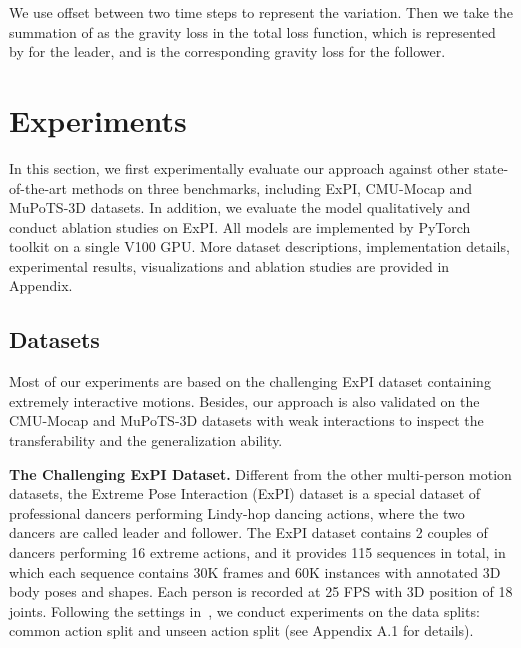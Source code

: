 \documentclass[10pt,twocolumn,letterpaper]{article}
\begin{document}
\vskip -0.05in
We use offset  between two time steps to represent the variation. 
Then we take the summation of  as the gravity loss in the total loss function, which is represented by  for the leader, and  is the corresponding gravity loss for the follower. 





\section{Experiments}\label{sec:exp}
In this section, we first experimentally evaluate our approach against other state-of-the-art methods on three benchmarks, including ExPI, CMU-Mocap and MuPoTS-3D datasets.
In addition, we evaluate the model qualitatively and conduct ablation studies on ExPI. 
All models are implemented by PyTorch toolkit on a single V100 GPU.
More dataset descriptions, implementation details, experimental results, visualizations and ablation studies are provided in Appendix.


\subsection{Datasets}\label{subsec:dataset}
Most of our experiments are based on the challenging ExPI dataset containing extremely interactive motions. 
Besides, our approach is also validated on the CMU-Mocap and MuPoTS-3D datasets with weak interactions to inspect the transferability and the generalization ability.

\vspace{1em}
\noindent\textbf{The Challenging ExPI Dataset.} 
Different from the other multi-person motion datasets, the Extreme Pose Interaction (ExPI) dataset is a special dataset of professional dancers performing Lindy-hop dancing actions, where the two dancers are called leader and follower. 
The ExPI dataset contains 2 couples of dancers performing 16 extreme actions, and it provides 115 sequences in total, in which each sequence contains 30K frames and 60K instances with annotated 3D body poses and shapes.
Each person is recorded at 25 FPS with 3D position of 18 joints. 
Following the settings in~\cite{guo2021multi}, we conduct experiments on the data splits: common action split and unseen action split (see Appendix {\color{red}A.1} for details). 
\end{document}

